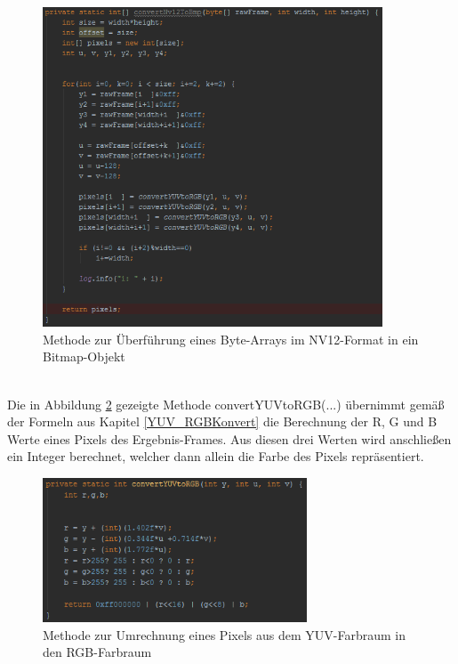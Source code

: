 \begin{figure}[h]
	\centering
	\includegraphics[width=0.9\textwidth]{Bilder/Bildverarbeitung/NV12_to_BMP.PNG}
	\caption{Methode zur Überführung eines Byte-Arrays im NV12-Format in ein Bitmap-Objekt}
	\label{fig:NV12_to_BMP}
\end{figure}

~\\
Die in Abbildung \ref{fig:YUV_to_RGB} gezeigte Methode convertYUVtoRGB(...) übernimmt gemäß der Formeln aus Kapitel \ref{YUV_RGBKonvert} die Berechnung der R, G und B Werte eines Pixels des Ergebnis-Frames. Aus diesen drei Werten wird anschließen ein Integer berechnet, welcher dann allein die Farbe des Pixels repräsentiert.
\clearpage
\begin{figure}[h]
	\centering
	\includegraphics[width=0.7\textwidth]{Bilder/Bildverarbeitung/convert_1_Pixel.PNG}
	\caption{Methode zur Umrechnung eines Pixels aus dem YUV-Farbraum in den RGB-Farbraum}
	\label{fig:YUV_to_RGB}
\end{figure}